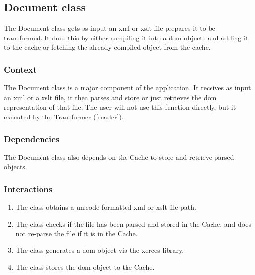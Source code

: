 \subsection{Document class}
\label{document}
\label{parser}

The Document class gets as input an \gls{xml} or \gls{xslt} file prepares it to be transformed.
It does this by either compiling it into a \gls{dom} objects and adding it to the cache or fetching the already compiled object from the cache.

\subsubsection{Context}

The Document class is a major component of the application.
It receives as input an \gls{xml} or a \gls{xslt} file, it then parses and store or just retrieves the \gls{dom} representation of that file.
The user will not use this function directly, but it executed by the Transformer (\ref{reader}).

\subsubsection{Dependencies}

The Document class also depends on the Cache to store and retrieve parsed objects.

\subsubsection{Interactions}

\begin{enumerate}
\item The class obtains a \gls{unicode} formatted \gls{xml} or \gls{xslt} file-path.
\item The class checks if the file has been parsed and stored in the Cache, and does not re-parse the file if it is in the Cache.
\item The class generates a \gls{dom} object via the \gls{xerces} library.
\item The class stores the \gls{dom} object to the Cache.
\end{enumerate}

